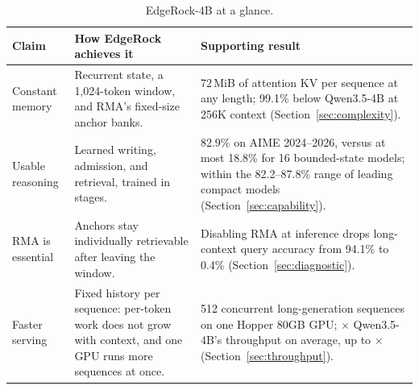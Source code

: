 \begin{table}[!htbp]
\centering\small
\caption{EdgeRock-4B at a glance.}
\label{tab:contributions}
\begin{tabularx}{\linewidth}{@{}>{\raggedright\arraybackslash}p{.16\linewidth}YY@{}}
\toprule
Claim & How EdgeRock achieves it & Supporting result\\
\midrule
Constant memory & Recurrent state, a 1,024-token window, and RMA's fixed-size anchor banks. & 72\,MiB of attention KV per sequence at any length; 99.1\% below Qwen3.5-4B at 256K context (Section~\ref{sec:complexity}).\\
\addlinespace[3pt]
Usable reasoning & Learned writing, admission, and retrieval, trained in stages. & 82.9\% on AIME 2024--2026, versus at most 18.8\% for 16 bounded-state models; within the 82.2--87.8\% range of leading compact models (Section~\ref{sec:capability}).\\
\addlinespace[3pt]
RMA is essential & Anchors stay individually retrievable after leaving the window. & Disabling RMA at inference drops long-context query accuracy from 94.1\% to 0.4\% (Section~\ref{sec:diagnostic}).\\
\addlinespace[3pt]
Faster serving & Fixed history per sequence: per-token work does not grow with context, and one GPU runs more sequences at once. & 512 concurrent long-generation sequences on one Hopper 80GB GPU; \EdgeBatchRatio{}$\times$ Qwen3.5-4B's throughput on average, up to \EdgePeakBatchRatio{}$\times$ (Section~\ref{sec:throughput}).\\
\bottomrule
\end{tabularx}
\end{table}

\FloatBarrier

